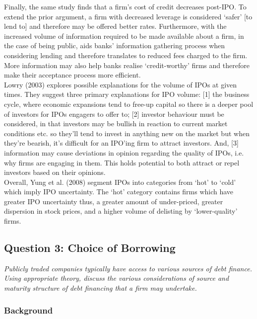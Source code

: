 \documentclass[11pt, english]{article}
\begin{document}
	Finally, the same study finds that a firm’s cost of credit decreases post-IPO. To extend the prior argument, a firm with decreased leverage is considered ‘safer’ [to lend to] and therefore may be offered better rates. Furthermore, with the increased volume of information required to be made available about a firm, in the case of being public, aids banks’ information gathering process when considering lending and therefore translates to reduced fees charged to the firm. More information may also help banks realise ‘credit-worthy’ firms and therefore make their acceptance process more efficient.\\

	Lowry (2003) explores possible explanations for the volume of IPOs at given times. They suggest three primary explanations for IPO volume: [1] the business cycle, where economic expansions tend to free-up capital so there is a deeper pool of investors for IPOs engagers to offer to; [2] investor behaviour must be considered, in that investors may be bullish in reaction to current market conditions etc. so they’ll tend to invest in anything new on the market but when they’re bearish, it’s difficult for an IPO’ing firm to attract investors. And, [3] information may cause deviations in opinion regarding the quality of IPOs, i.e. why firms are engaging in them. This holds potential to both attract or repel investors based on their opinions.\\

	Overall, Yung et al. (2008) segment IPOs into categories from ‘hot’ to ‘cold’ which imply IPO uncertainty. The ‘hot’ category contains firms which have greater IPO uncertainty thus, a greater amount of under-priced, greater dispersion in stock prices, and a higher volume of delisting by ‘lower-quality’ firms.

	\newpage

	\subsection{Question 3: Choice of Borrowing}

	\textit{Publicly traded companies typically have access to various sources of debt finance. Using appropriate theory, discuss the various considerations of source and maturity structure of debt financing that a firm may undertake.}

		\subsubsection*{Background}
\end{document}
